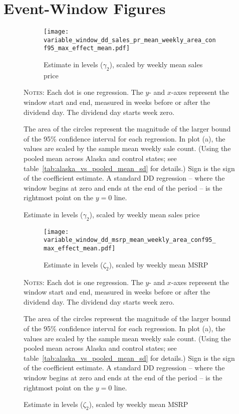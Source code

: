 \documentclass[11pt,letterpaper,oneside]{article}
\newcommand{\varWindowDDnotes}{%
Each dot is one regression.
The $y$- and $x$-axes represent the window start and end, measured in weeks before or after the dividend day.
The dividend day starts week zero.

 The area of the circles represent the magnitude of the larger bound of the 95\% confidence interval for each regression.
In plot (a), the values are scaled by the sample mean weekly sale count.
(Using the pooled mean across Alaska and control states; see table~\ref{tab:alaska_vs_pooled_mean_sd} for details.)
Sign is the sign of the coefficient estimate. %
A standard DD regression -- where the window begins at zero and ends at the end of the period -- is the rightmost point on the $y=0$ line.
}
\begin{document}
\begin{doublespacing}
\FloatBarrier


\pagebreak
\end{doublespacing}
\fancyhfoffset[O]{0pt}


\printbibliography

\begin{refsection}
\nocite{*}
\printbibliography[heading=subbibliography, title={Software Used}]
\end{refsection}


\pagebreak
\appendix

\section{Event-Window Figures}


\begin{figure}[!hbt]
    \caption{Sales price effects with varying windows}
    \label{fig:variable_window_sales_price}
    \begin{subfigure}{0.97\linewidth}
        \caption{Estimate in levels ($\gamma_2$), scaled by weekly mean sales price}
        \texttt{[image: variable\_window\_dd\_sales\_pr\_mean\_weekly\_area\_conf95\_max\_effect\_mean.pdf]}
    \end{subfigure}

    {\footnotesize
    \textsc{Notes:}
    \varWindowDDnotes
    }
\end{figure}

\begin{figure}[!hbt]
    \caption{MSRP effects with varying windows}
    \label{fig:variable_window_msrp}
    \begin{subfigure}{0.97\linewidth}
        \caption{Estimate in levels ($\zeta_2$), scaled by weekly mean MSRP}
        \texttt{[image: variable\_window\_dd\_msrp\_mean\_weekly\_area\_conf95\_max\_effect\_mean.pdf]}
    \end{subfigure}

    {\footnotesize
    \textsc{Notes:}
    \varWindowDDnotes
    }
\end{figure}
\end{document}
